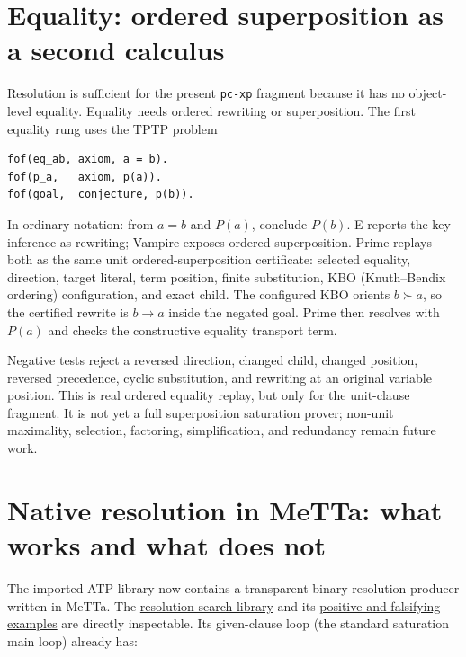 \documentclass[10pt]{article}
\newcommand{\pcxp}{\texttt{pc-xp}}
\begin{document}
\section{Equality: ordered superposition as a second calculus}

Resolution is sufficient for the present \pcxp{} fragment because it has no
object-level equality.  Equality needs ordered rewriting or superposition.
The first equality rung uses the TPTP problem

\begin{lstlisting}
fof(eq_ab, axiom, a = b).
fof(p_a,   axiom, p(a)).
fof(goal,  conjecture, p(b)).
\end{lstlisting}

In ordinary notation: from $a=b$ and $P(a)$, conclude $P(b)$.
E reports the key inference as rewriting; Vampire exposes ordered
superposition.  Prime replays both as the same unit ordered-superposition
certificate: selected equality, direction, target literal, term position,
finite substitution, KBO (Knuth--Bendix ordering) configuration, and exact
child.  The configured KBO
orients $b \succ a$, so the certified rewrite is $b\to a$ inside the negated
goal.  Prime then resolves with $P(a)$ and checks the constructive equality
transport term.

Negative tests reject a reversed direction, changed child, changed position,
reversed precedence, cyclic substitution, and rewriting at an original
variable position.  This is real ordered equality replay, but only for the
unit-clause fragment.  It is not yet a full superposition saturation prover;
non-unit maximality, selection, factoring, simplification, and redundancy
remain future work.

\section{Native resolution in MeTTa: what works and what does not}

The imported ATP library now contains a transparent binary-resolution
producer written in MeTTa.  The
\href{https://github.com/zariuq/CeTTa/blob/cetta-he-prime-dtt-chainer-20260715/lib/atp/resolution_search.metta}
{resolution search library} and its
\href{https://github.com/zariuq/CeTTa/blob/cetta-he-prime-dtt-chainer-20260715/tests/prime/practical/atp_resolution_search.metta}
{positive and falsifying examples} are directly inspectable.  Its given-clause
loop (the standard saturation main loop) already has:
\end{document}
